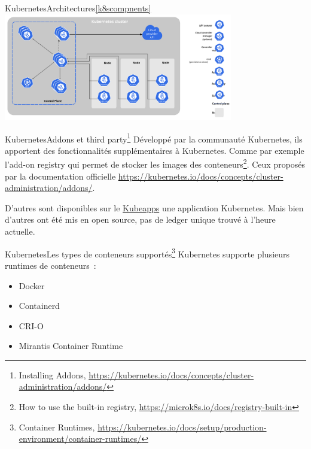 \documentclass{beamer}
\begin{document}
    \begin{frame}{Kubernetes}{Architectures\cref{k8scompnents}}
        \centering
        \includegraphics[width=10cm]{image/components-of-kubernetes}
    \end{frame}

    \begin{frame}{Kubernetes}{Addons et third party\footnote{Installing Addons, \url{https://kubernetes.io/docs/concepts/cluster-administration/addons/}}}
        Développé par la communauté Kubernetes, ils apportent des fonctionnalités supplémentaires à Kubernetes.
        Comme par exemple l'add-on registry qui permet de stocker les images des conteneurs\footnote{How to use the built-in registry, \url{https://microk8s.io/docs/registry-built-in}}.
        \bigbreak
        Ceux proposés par la documentation officielle \url{https://kubernetes.io/docs/concepts/cluster-administration/addons/}.

        D'autres sont disponibles sur le \href{https://hub.kubeapps.com/}{Kubeapps} une application Kubernetes.
        \bigbreak
        Mais bien d'autres ont été mis en open source, pas de ledger unique trouvé à l'heure actuelle.
    \end{frame}

    \begin{frame}{Kubernetes}{Les types de conteneurs supportés\footnote{Container Runtimes, \url{https://kubernetes.io/docs/setup/production-environment/container-runtimes/}}}
        Kubernetes supporte plusieurs runtimes de conteneurs~:
        \begin{itemize}
            \item Docker
            \item Containerd
            \item CRI-O
            \item Mirantis Container Runtime
        \end{itemize}
    \end{frame}
\end{document}
